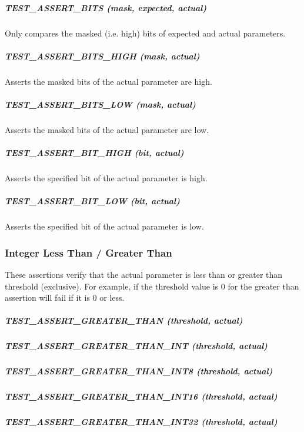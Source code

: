 \subparagraph*{{\ttfamily T\+E\+S\+T\+\_\+\+A\+S\+S\+E\+R\+T\+\_\+\+B\+I\+TS (mask, expected, actual)}}

Only compares the masked (i.\+e. high) bits of {\ttfamily expected} and {\ttfamily actual} parameters.

\subparagraph*{{\ttfamily T\+E\+S\+T\+\_\+\+A\+S\+S\+E\+R\+T\+\_\+\+B\+I\+T\+S\+\_\+\+H\+I\+GH (mask, actual)}}

Asserts the masked bits of the {\ttfamily actual} parameter are high.

\subparagraph*{{\ttfamily T\+E\+S\+T\+\_\+\+A\+S\+S\+E\+R\+T\+\_\+\+B\+I\+T\+S\+\_\+\+L\+OW (mask, actual)}}

Asserts the masked bits of the {\ttfamily actual} parameter are low.

\subparagraph*{{\ttfamily T\+E\+S\+T\+\_\+\+A\+S\+S\+E\+R\+T\+\_\+\+B\+I\+T\+\_\+\+H\+I\+GH (bit, actual)}}

Asserts the specified bit of the {\ttfamily actual} parameter is high.

\subparagraph*{{\ttfamily T\+E\+S\+T\+\_\+\+A\+S\+S\+E\+R\+T\+\_\+\+B\+I\+T\+\_\+\+L\+OW (bit, actual)}}

Asserts the specified bit of the {\ttfamily actual} parameter is low.

\subsubsection*{Integer Less Than / Greater Than}

These assertions verify that the {\ttfamily actual} parameter is less than or greater than {\ttfamily threshold} (exclusive). For example, if the threshold value is 0 for the greater than assertion will fail if it is 0 or less.

\subparagraph*{{\ttfamily T\+E\+S\+T\+\_\+\+A\+S\+S\+E\+R\+T\+\_\+\+G\+R\+E\+A\+T\+E\+R\+\_\+\+T\+H\+AN (threshold, actual)}}

\subparagraph*{{\ttfamily T\+E\+S\+T\+\_\+\+A\+S\+S\+E\+R\+T\+\_\+\+G\+R\+E\+A\+T\+E\+R\+\_\+\+T\+H\+A\+N\+\_\+\+I\+NT (threshold, actual)}}

\subparagraph*{{\ttfamily T\+E\+S\+T\+\_\+\+A\+S\+S\+E\+R\+T\+\_\+\+G\+R\+E\+A\+T\+E\+R\+\_\+\+T\+H\+A\+N\+\_\+\+I\+N\+T8 (threshold, actual)}}

\subparagraph*{{\ttfamily T\+E\+S\+T\+\_\+\+A\+S\+S\+E\+R\+T\+\_\+\+G\+R\+E\+A\+T\+E\+R\+\_\+\+T\+H\+A\+N\+\_\+\+I\+N\+T16 (threshold, actual)}}

\subparagraph*{{\ttfamily T\+E\+S\+T\+\_\+\+A\+S\+S\+E\+R\+T\+\_\+\+G\+R\+E\+A\+T\+E\+R\+\_\+\+T\+H\+A\+N\+\_\+\+I\+N\+T32 (threshold, actual)}}

